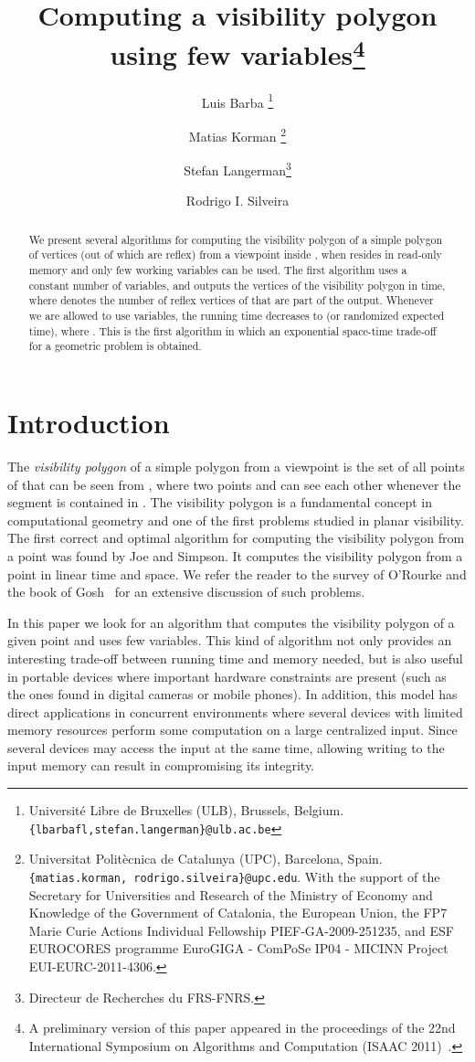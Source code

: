 \documentclass[a4paper]{article}
\title{Computing a visibility polygon using few variables\thanks{A preliminary version of this paper appeared in the proceedings of the 22nd International Symposium on Algorithms and Computation (ISAAC 2011)~\cite{bkls-cvpufv-11}.}}
\author{
Luis Barba
\thanks{Universit\'e Libre de Bruxelles (ULB), Brussels, Belgium. {\tt \{lbarbafl,stefan.langerman\}@ulb.ac.be}}
\and Matias Korman
\thanks{Universitat Polit\`{e}cnica de Catalunya (UPC), Barcelona, Spain. {\tt  \{matias.korman, rodrigo.silveira\}@upc.edu}. With the support of the Secretary for Universities and Research of the Ministry of Economy and Knowledge of the Government of Catalonia, the European Union, the FP7 Marie Curie Actions Individual Fellowship PIEF-GA-2009-251235, and ESF EUROCORES programme EuroGIGA - ComPoSe IP04 - MICINN Project EUI-EURC-2011-4306.}
\and Stefan Langerman\footnotemark[2]
\thanks{Directeur de Recherches du FRS-FNRS.}
\and Rodrigo I. Silveira\footnotemark[3]
}
\date{}
\begin{document}
\maketitle

\begin{abstract}
We present several algorithms for computing the visibility polygon of a simple polygon  of  vertices (out of which  are reflex) from a viewpoint inside , when  resides in read-only memory and only few working variables can be used.
The first algorithm uses a constant number of variables, and outputs the vertices of the visibility polygon in  time, where  denotes the number of reflex vertices of  that are part of the output. Whenever we are allowed to use  variables, the running time decreases to  (or  randomized expected time), where . This is the first algorithm in which an exponential space-time trade-off for a geometric problem is obtained.
\end{abstract}   


\section{Introduction}


The \emph{visibility polygon} of a simple polygon  from a viewpoint  is the set of all points of  that can be seen from , where two points  and  can see each other whenever the segment  is contained in .
The visibility polygon is a fundamental concept in computational geometry and one of the first problems studied in planar visibility. 
The first correct and optimal algorithm for computing the visibility polygon from a point was found by  Joe and Simpson\cite{js-clvpa-87}. It computes the visibility polygon from a point in linear time and space. 
We refer the reader to the survey of O'Rourke \cite{r-v-04} and the book of Gosh~\cite{g-vap-07} for an extensive discussion of such problems.





In this paper we look for an algorithm that computes the visibility polygon of a given point and uses few variables. This kind of algorithm not only provides an interesting trade-off between running time and memory needed, but is also useful in portable devices where important hardware constraints are present (such as the ones found in digital cameras or mobile phones). 
In addition, this model has direct applications in concurrent environments where several devices with limited memory resources perform some computation on a large centralized input. 
Since several devices may access the input at the same time, allowing writing to the input memory can result in compromising its integrity.
\end{document}
